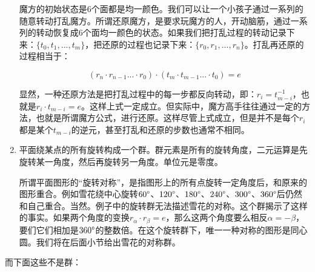 \documentclass[b5paper]{ctexart}
\begin{document}
\begin{enumerate}
魔方的初始状态是6个面都是均一颜色。我们可以让一个小孩子通过一系列的随意转动打乱魔方。所谓还原魔方，是要求玩魔方的人，开动脑筋，通过一系列的转动恢复成6个面均一颜色的状态。如果我们把打乱过程的转动记录下来：$\{t_0, t_1, ..., t_m\}$，把还原的过程也记录下来：$\{r_0, r_1, ..., r_n\}$。打乱再还原的过程相当于：

\[
  (r_n \cdot r_{n-1} ... \cdot r_0) \cdot (t_m \cdot t_{m-1} ... \cdot t_0) = e
\]

显然，一种还原方法是把打乱过程中的每一步都反向转动，即：$r_i = t_{m-i}^{-1}$，也就是$r_i \cdot t_{m-i} = e$。这样上式一定成立。但实际中，魔方高手往往通过一定的方法，也就是所谓魔方公式，进行还原。这样尽管上式成立，但是并不是每个$r_i$都是某个$t_{m-i}$的逆元，甚至打乱和还原的步数也通常不相同。

\item 平面绕某点的所有旋转构成一个群。群元素是所有的旋转角度，二元运算是先旋转某一角度，然后再旋转另一角度。单位元是零度。

所谓平面图形的“旋转对称”，是指图形上的所有点旋转一定角度后，和原来的图形重合。例如雪花绕中心旋转$60\degree$、$120\degree$、$180\degree$、$240\degree$、$300\degree$、$360\degree$后仍然和自己重合。当然。例子中的旋转群无法描述雪花的对称。这个群揭示了这样的事实。如果两个角度的变换$r_{\alpha} \cdot r_{\beta} = e$，那么这两个角度要么相反$\alpha = -\beta$，要们它们相加是$360\degree$的整数倍。在这个旋转群下，唯一一种对称的图形是同心圆。我们将在后面小节给出雪花的对称群。

\end{enumerate}

而下面这些不是群：
\end{document}
